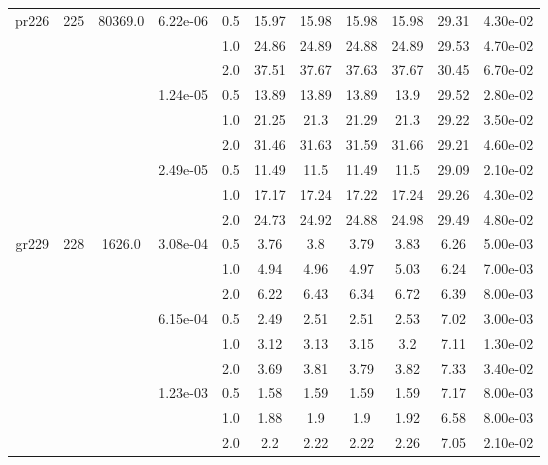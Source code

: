 \begin{table*}[htb!]
\begin{tabular}{|c|c|c|c|c|c|c|c|c|c|c|}
\hline
 	\multirow{9}{*}{pr226} & \multirow{9}{*}{225} & \multirow{9}{*}{80369.0} & \multirow{3}{*}{6.22e-06} & 0.5 & 15.97 & 15.98 & 15.98 & 15.98 & 29.31 & 4.30e-02 \\
	& & & & 1.0 & 24.86 & 24.89 & 24.88 & 24.89 & 29.53 & 4.70e-02 \\
	& & & & 2.0 & 37.51 & 37.67 & 37.63 & 37.67 & 30.45 & 6.70e-02 \\

\cline{4-11}
	& & &\multirow{3}{*}{1.24e-05} & 0.5 & 13.89 & 13.89 & 13.89 & 13.9 & 29.52 & 2.80e-02 \\
	& & & & 1.0 & 21.25 & 21.3 & 21.29 & 21.3 & 29.22 & 3.50e-02 \\
	& & & & 2.0 & 31.46 & 31.63 & 31.59 & 31.66 & 29.21 & 4.60e-02 \\

\cline{4-11}
	& & &\multirow{3}{*}{2.49e-05} & 0.5 & 11.49 & 11.5 & 11.49 & 11.5 & 29.09 & 2.10e-02 \\
	& & & & 1.0 & 17.17 & 17.24 & 17.22 & 17.24 & 29.26 & 4.30e-02 \\
	& & & & 2.0 & 24.73 & 24.92 & 24.88 & 24.98 & 29.49 & 4.80e-02 \\

\hline
 	\multirow{9}{*}{gr229} & \multirow{9}{*}{228} & \multirow{9}{*}{1626.0} & \multirow{3}{*}{3.08e-04} & 0.5 & 3.76 & 3.8 & 3.79 & 3.83 & 6.26 & 5.00e-03 \\
	& & & & 1.0 & 4.94 & 4.96 & 4.97 & 5.03 & 6.24 & 7.00e-03 \\
	& & & & 2.0 & 6.22 & 6.43 & 6.34 & 6.72 & 6.39 & 8.00e-03 \\

\cline{4-11}
	& & &\multirow{3}{*}{6.15e-04} & 0.5 & 2.49 & 2.51 & 2.51 & 2.53 & 7.02 & 3.00e-03 \\
	& & & & 1.0 & 3.12 & 3.13 & 3.15 & 3.2 & 7.11 & 1.30e-02 \\
	& & & & 2.0 & 3.69 & 3.81 & 3.79 & 3.82 & 7.33 & 3.40e-02 \\

\cline{4-11}
	& & &\multirow{3}{*}{1.23e-03} & 0.5 & 1.58 & 1.59 & 1.59 & 1.59 & 7.17 & 8.00e-03 \\
	& & & & 1.0 & 1.88 & 1.9 & 1.9 & 1.92 & 6.58 & 8.00e-03 \\
	& & & & 2.0 & 2.2 & 2.22 & 2.22 & 2.26 & 7.05 & 2.10e-02 \\
	\hline
	\end{tabular}
\end{table*}
